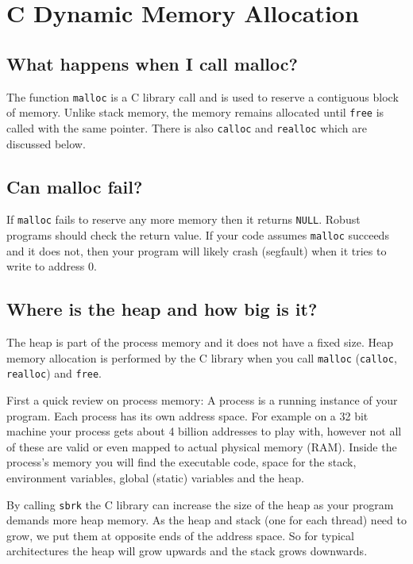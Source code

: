 \section{C Dynamic Memory Allocation}\label{c-dynamic-memory-allocation}

\subsection{What happens when I call
malloc?}\label{what-happens-when-i-call-malloc}

The function \texttt{malloc} is a C library call and is used to reserve
a contiguous block of memory. Unlike stack memory, the memory remains
allocated until \texttt{free} is called with the same pointer. There is
also \texttt{calloc} and \texttt{realloc} which are discussed below.

\subsection{Can malloc fail?}\label{can-malloc-fail}

If \texttt{malloc} fails to reserve any more memory then it returns
\texttt{NULL}. Robust programs should check the return value. If your
code assumes \texttt{malloc} succeeds and it does not, then your program
will likely crash (segfault) when it tries to write to address 0.

\subsection{Where is the heap and how big is
it?}\label{where-is-the-heap-and-how-big-is-it}

The heap is part of the process memory and it does not have a fixed
size. Heap memory allocation is performed by the C library when you call
\texttt{malloc} (\texttt{calloc}, \texttt{realloc}) and \texttt{free}.

First a quick review on process memory: A process is a running instance
of your program. Each process has its own address space. For example on
a 32 bit machine your process gets about 4 billion addresses to play
with, however not all of these are valid or even mapped to actual
physical memory (RAM). Inside the process's memory you will find the
executable code, space for the stack, environment variables, global
(static) variables and the heap.

By calling \texttt{sbrk} the C library can increase the size of the heap
as your program demands more heap memory. As the heap and stack (one for
each thread) need to grow, we put them at opposite ends of the address
space. So for typical architectures the heap will grow upwards and the
stack grows downwards.

